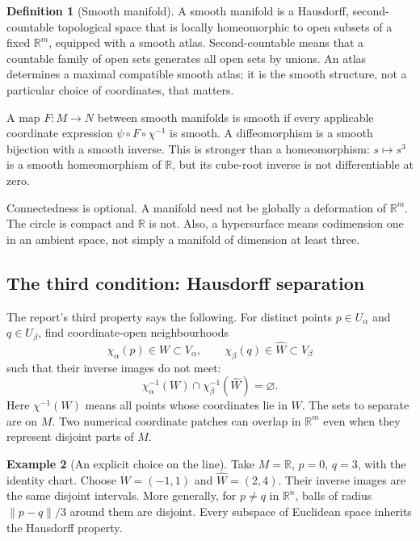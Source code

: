 \documentclass[11pt,a4paper]{article}
\numberwithin{equation}{section}
\theoremstyle{definition}
\newtheorem{definition}{Definition}[section]
\newtheorem{example}[definition]{Example}
\theoremstyle{plain}
\theoremstyle{remark}
\newcommand{\R}{\mathbb R}
\begin{document}
\begin{definition}[Smooth manifold]
A smooth manifold is a Hausdorff, second-countable topological space that is locally homeomorphic to open subsets of a fixed $\R^m$, equipped with a smooth atlas. Second-countable means that a countable family of open sets generates all open sets by unions. An atlas determines a maximal compatible smooth atlas; it is the smooth structure, not a particular choice of coordinates, that matters.
\end{definition}
A map $F:M\to N$ between smooth manifolds is smooth if every applicable coordinate expression $\psi\circ F\circ\chi^{-1}$ is smooth. A diffeomorphism is a smooth bijection with a smooth inverse. This is stronger than a homeomorphism: $s\mapsto s^3$ is a smooth homeomorphism of $\R$, but its cube-root inverse is not differentiable at zero.

Connectedness is optional. A manifold need not be globally a deformation of $\R^m$. The circle is compact and $\R$ is not. Also, a hypersurface means codimension one in an ambient space, not simply a manifold of dimension at least three.

\subsection{The third condition: Hausdorff separation}\label{sec:hausdorff}
The report's third property says the following. For distinct points $p\in U_\alpha$ and $q\in U_\beta$, find coordinate-open neighbourhoods
\[
\chi_\alpha(p)\in W\subset V_\alpha,
\qquad \chi_\beta(q)\in\widehat W\subset V_\beta
\]
such that their inverse images do not meet:
\begin{equation}\label{eq:hausdorff}
\chi_\alpha^{-1}(W)\cap\chi_\beta^{-1}(\widehat W)=\varnothing.
\end{equation}
Here $\chi^{-1}(W)$ means all points whose coordinates lie in $W$. The sets to separate are on $M$. Two numerical coordinate patches can overlap in $\R^m$ even when they represent disjoint parts of $M$.

\begin{example}[An explicit choice on the line]
Take $M=\R$, $p=0$, $q=3$, with the identity chart. Choose $W=(-1,1)$ and $\widehat W=(2,4)$. Their inverse images are the same disjoint intervals. More generally, for $p\ne q$ in $\R^n$, balls of radius $\|p-q\|/3$ around them are disjoint. Every subspace of Euclidean space inherits the Hausdorff property.
\end{example}
\end{document}
